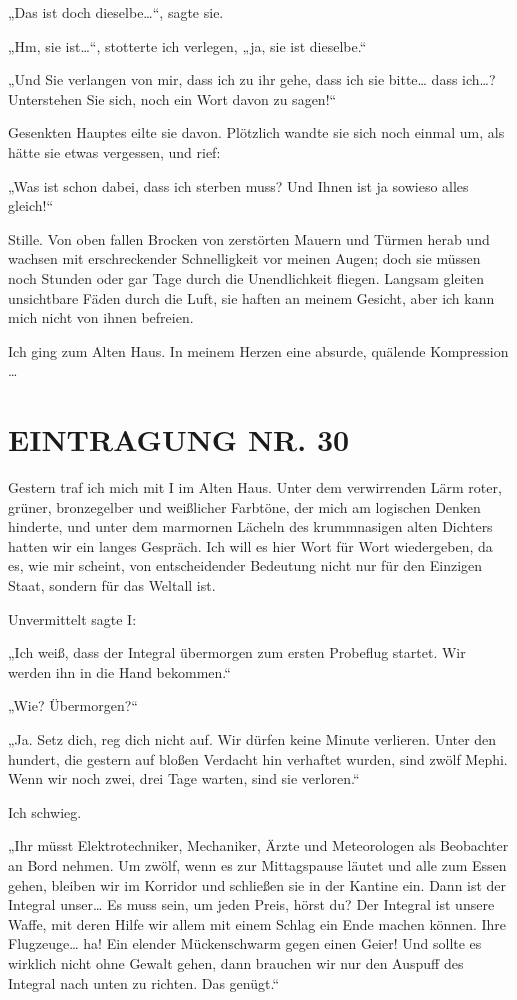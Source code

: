 „Das ist doch dieselbe\ldots{}“, sagte sie.

„Hm, sie ist\ldots{}“, stotterte ich verlegen, „ja, sie ist dieselbe.“

„Und Sie verlangen von mir, dass ich zu ihr gehe, dass ich sie
bitte\ldots{} dass ich\ldots{}? Unterstehen Sie sich, noch ein Wort davon zu
sagen!“

Gesenkten Hauptes eilte sie davon. Plötzlich wandte sie sich noch
einmal um, als hätte sie etwas vergessen, und rief:

„Was ist schon dabei, dass ich sterben muss? Und Ihnen ist ja
sowieso alles gleich!“

Stille. Von oben fallen Brocken von zerstörten Mauern und Türmen
herab und wachsen mit erschreckender Schnelligkeit vor meinen
Augen; doch sie müssen noch Stunden oder gar Tage durch die
Unendlichkeit fliegen.
%
Langsam gleiten unsichtbare Fäden durch die Luft, sie haften an
meinem Gesicht, aber ich kann mich nicht von ihnen befreien.

Ich ging zum Alten Haus. In meinem Herzen eine absurde, quälende
Kompression \ldots{}

\section{EINTRAGUNG NR. 30}

Gestern traf ich mich mit I im Alten Haus. Unter dem verwirrenden
Lärm roter, grüner, bronzegelber und weißlicher Farbtöne, der mich
am logischen Denken hinderte, und unter dem marmornen Lächeln des
krummnasigen alten Dichters hatten wir ein langes Gespräch. Ich
will es hier Wort für Wort wiedergeben, da es, wie mir scheint, von
entscheidender Bedeutung nicht nur für den Einzigen Staat, sondern
für das Weltall ist.

Unvermittelt sagte I:

„Ich weiß, dass der Integral übermorgen zum ersten Probeflug
startet. Wir werden ihn in die Hand bekommen.“

„Wie? Übermorgen?“

„Ja. Setz dich, reg dich nicht auf. Wir dürfen keine Minute
verlieren. Unter den hundert, die gestern auf bloßen Verdacht hin
verhaftet wurden, sind zwölf Mephi. Wenn wir noch zwei, drei Tage
warten, sind sie verloren.“

Ich schwieg.

„Ihr müsst Elektrotechniker, Mechaniker, Ärzte und Meteorologen als
Beobachter an Bord nehmen. Um zwölf, wenn es zur Mittagspause
läutet und alle zum Essen gehen, bleiben wir im Korridor und
schließen sie in der Kantine ein. Dann ist der Integral unser\ldots{} Es
muss sein, um jeden Preis, hörst du? Der Integral ist unsere Waffe,
mit deren Hilfe wir allem mit einem Schlag ein Ende machen können.
Ihre Flugzeuge\ldots{} ha! Ein elender Mückenschwarm gegen einen Geier!
Und sollte es wirklich nicht ohne Gewalt gehen, dann brauchen wir
nur den Auspuff des Integral nach unten zu richten. Das genügt.“

